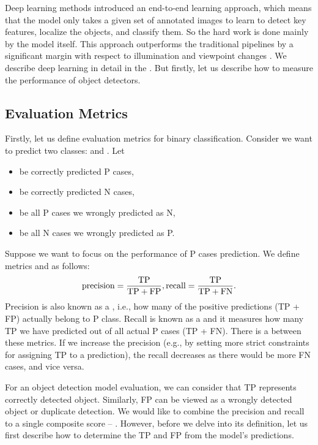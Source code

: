 Deep learning methods introduced an end-to-end learning approach, which means
that the model only takes a given set of annotated images to learn to detect key
features, localize the objects, and classify them. So the hard work is done
mainly by the model itself. This approach outperforms the traditional pipelines
by a significant margin with respect to illumination and viewpoint changes
\cite{outperforming}. We describe deep learning in detail in the
. But firstly, let us describe how to measure the
performance of object detectors.

\subsection{Evaluation Metrics}
Firstly, let us define evaluation metrics for binary classification. Consider we
want to predict two classes:  and . Let
\begin{itemize}
    \item {} be correctly predicted P cases,
    \item {} be correctly predicted N cases,
    \item {} be all P cases we wrongly predicted as N,
    \item {} be all N cases we wrongly predicted as P.
\end{itemize}
Suppose we want to focus on the performance of P cases prediction. We define
metrics  and  as follows:
$$
    \text{precision} = \frac{\text{TP}}{\text{TP} + \text{FP}}, \\
    \text{recall} = \frac{\text{TP}}{\text{TP} + \text{FN}}.
$$
Precision is also known as a , i.e., how many of
the positive predictions (TP + FP) actually belong to P class. Recall is known
as a  and it measures how many TP we have predicted out
of all actual P cases (TP + FN). There is a  between
these metrics. If we increase the precision (e.g., by setting more strict
constraints for assigning TP to a prediction), the recall decreases as there
would be more FN cases, and vice versa.

For an object detection model evaluation, we can consider that TP represents
correctly detected object. Similarly, FP can be viewed as a wrongly detected
object or duplicate detection. We would like to combine the precision and recall
to a single composite score -- . However,
before we delve into its definition, let us first describe how to determine the
TP and FP from the model's predictions.


